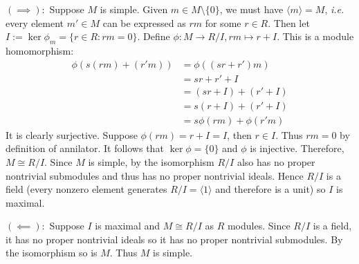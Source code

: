 \documentclass[12pt]{article}
\begin{document}
\begin{problem}[8]

	$ (\implies):$ Suppose $ M$ is simple. Given $ m \in M \setminus \{0\} $, we must have $ \langle m \rangle = M$, \emph{i.e.} every element $ m' \in M$ can be expressed as $ rm$ for some  $ r \in R$. Then let $ I:= \ker \phi_m = \{r \in R: rm=0\} $. Define $ \phi: M \to R /I, rm\mapsto r+I$. This is a module homomorphism:
\begin{align*}
	\phi(s(rm) + (r'm)) &= \phi((s r+ r')m) \\
	&= s r+ r' + I \\
	&= (s r+I) + (r'+I) \\
	&= s (r+I) + (r'+I) \\
	&= s \phi(rm) + \phi(r'm) 
\end{align*}
It is clearly surjective. Suppose $ \phi(rm) = r+I= I$, then $ r \in I$. Thus $ rm = 0$ by definition of annilator. It follows that  $ \ker \phi = \{0\} $ and $ \phi$ is injective. Therefore, $ M \cong R /I$. Since $ M$ is simple, by the isomorphism $ R /I$ also has no proper nontrivial submodules and thus has no proper nontrivial ideals. Hence  $ R /I$ is a field (every nonzero element generates $ R /I = \langle 1 \rangle$ and therefore is a unit) so $ I$ is maximal.

$ (\impliedby):$ Suppose $ I$ is maximal and  $ M \cong R /I$ as $ R$ modules. Since  $ R /I$ is a field, it has no proper nontrivial ideals so it has no proper nontrivial submodules. By the isomorphism so is  $ M$. Thus  $ M$ is simple.
\end{problem}
\end{document}
